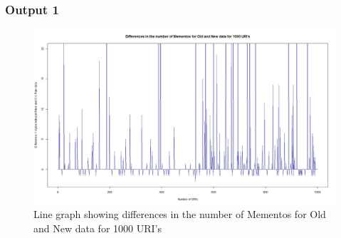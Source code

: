 \subsubsection{Output 1}
\begin{figure}[ht]    
    \begin{center}
        \includegraphics[scale=0.3]{differnce_graph.jpeg}
        \caption{Line graph showing differences in the number of Mementos for Old and New data for 1000 URI's }
        \label{Samplet1}
    \end{center}
\end{figure}
\newpage


